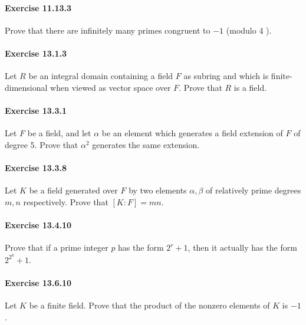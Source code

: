 \documentclass{article}
\begin{document}
\paragraph{Exercise 11.13.3} Prove that there are infinitely many primes congruent to $-1$ (modulo 4 ).

\paragraph{Exercise 13.1.3} Let $R$ be an integral domain containing a field $F$ as subring and which is finite-dimensional when viewed as vector space over $F$. Prove that $R$ is a field.

\paragraph{Exercise 13.3.1} Let $F$ be a field, and let $\alpha$ be an element which generates a field extension of $F$ of degree 5. Prove that $\alpha^2$ generates the same extension.

\paragraph{Exercise 13.3.8} Let $K$ be a field generated over $F$ by two elements $\alpha, \beta$ of relatively prime degrees $m, n$ respectively. Prove that $[K: F]=m n$.

\paragraph{Exercise 13.4.10} Prove that if a prime integer $p$ has the form $2^r+1$, then it actually has the form $2^{2^k}+1$. 

\paragraph{Exercise 13.6.10} Let $K$ be a finite field. Prove that the product of the nonzero elements of $K$ is $-1$.
\end{document}
